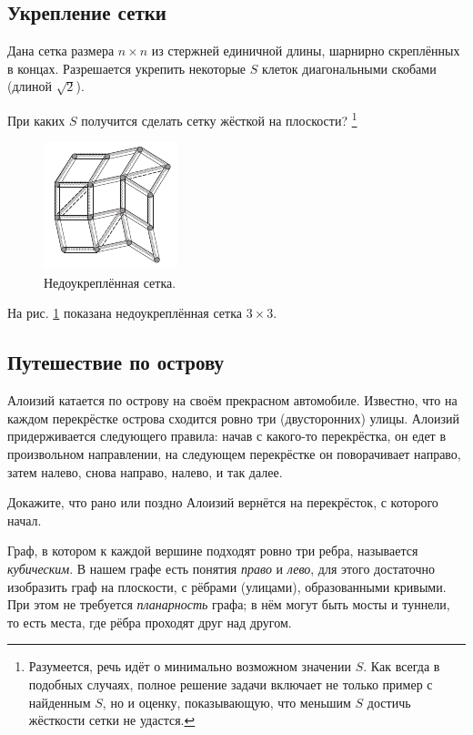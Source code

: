 \subsection*{Укрепление сетки}

Дана сетка размера $n \times n$ из стержней единичной длины, шарнирно скреплённых в концах.
Разрешается укрепить некоторые $S$ клеток диагональными скобами (длиной $\sqrt{2}$).

При каких $S$ получится сделать сетку жёсткой на плоскости?%
\footnote{Разумеется, речь идёт о минимально возможном значении $S$.
Как всегда в подобных случаях, полное решение задачи включает не только пример с найденным $S$, но и оценку, показывающую, что меньшим $S$ достичь жёсткости сетки не удастся.\pr}

\begin{figure}[ht!]
\centering
\includegraphics[scale=1]{pics/lattice1}
\caption{Недоукреплённая сетка.}
\label{pic:lattice1}
\end{figure}

На рис. \ref{pic:lattice1} показана недоукреплённая сетка $3 \times 3$.


\subsection*{Путешествие по острову}

Алоизий катается по острову на своём прекрасном автомобиле.
Известно, что на каждом перекрёстке острова сходится ровно три (двусторонних) улицы.
Алоизий придерживается следующего правила:
начав с какого-то перекрёстка, он едет в произвольном направлении, на следующем перекрёстке он поворачивает направо, затем налево,
снова направо, налево, и так далее.

Докажите, что рано или поздно Алоизий вернётся на перекрёсток, с которого начал.

Граф, в котором к каждой вершине подходят ровно три ребра, называется \emph{кубическим}.
В нашем графе есть понятия \emph{право} и \emph{лево},
для этого достаточно изобразить граф на плоскости, с рёбрами (улицами), образованными кривыми.
При этом не требуется \emph{планарность} графа;
в нём могут быть мосты и туннели, то есть места, где рёбра проходят друг над другом.

